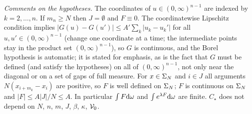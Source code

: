 \noindent\emph{Comments on the hypotheses.}
The coordinates of $u\in(0,\infty)^{n-1}$ are indexed by $k=2,\dots,n$. If $m_n\ge N$ then $J=\emptyset$ and $F\equiv0$.
The coordinatewise Lipschitz condition implies $|G(u)-G(u')|\le A'\sum_k|u_k-u_k'|$ for all $u,u'\in(0,\infty)^{n-1}$ (change one coordinate at a time; the intermediate points stay in the product set $(0,\infty)^{n-1}$), so $G$ is continuous, and the Borel hypothesis is automatic; it is stated for emphasis, as is the fact that $G$ must be defined (and satisfy the hypotheses) on all of $(0,\infty)^{n-1}$, not only near the diagonal or on a set of gaps of full measure.
For $x\in\Sigma_N$ and $i\in J$ all arguments $N(x_{i+m_k}-x_i)$ are positive, so $F$ is well defined on $\Sigma_N$; $F$ is continuous on $\Sigma_N$ and $|F|\le A|J|/N\le A$. In particular $\int F\mathrm{d}\omega$ and $\int e^{\lambda F}\mathrm{d}\omega$ are finite.
$C_\star$ does not depend on $N$, $n$, $m$, $J$, $\beta$, $\kappa$, $\mathcal{V}_0$.

